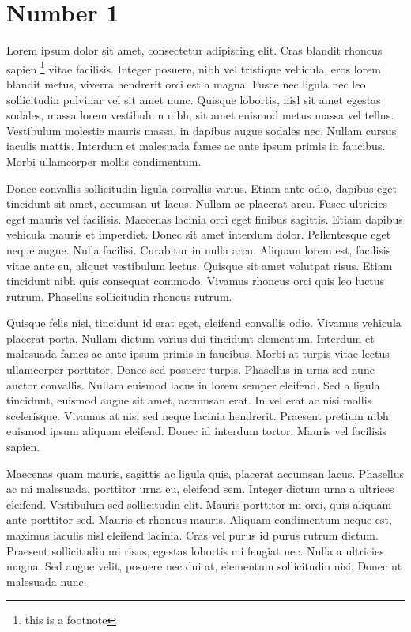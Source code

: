 \documentclass{tufte-handout}
\begin{document}
\section{Number 1}\label{number-1}

Lorem ipsum dolor sit amet, consectetur adipiscing elit. Cras blandit
rhoncus sapien \footnote{this is a footnote} vitae facilisis. Integer
posuere, nibh vel tristique vehicula, eros lorem blandit metus, viverra
hendrerit orci est a magna. Fusce nec ligula nec leo sollicitudin
pulvinar vel sit amet nunc. Quisque lobortis, nisl sit amet egestas
sodales, massa lorem vestibulum nibh, sit amet euismod metus massa vel
tellus. Vestibulum molestie mauris massa, in dapibus augue sodales nec.
Nullam cursus iaculis mattis. Interdum et malesuada fames ac ante ipsum
primis in faucibus. Morbi ullamcorper mollis condimentum.

Donec convallis sollicitudin ligula convallis varius. Etiam ante odio,
dapibus eget tincidunt sit amet, accumsan ut lacus. Nullam ac placerat
arcu. Fusce ultricies eget mauris vel facilisis. Maecenas lacinia orci
eget finibus sagittis. Etiam dapibus \autocite{Lande1979} vehicula
mauris et imperdiet. Donec sit amet interdum dolor. Pellentesque eget
neque augue. Nulla facilisi. Curabitur in nulla arcu. Aliquam lorem est,
facilisis vitae ante eu, aliquet vestibulum lectus. Quisque sit amet
volutpat risus. Etiam tincidunt nibh quis consequat commodo. Vivamus
rhoncus orci quis leo luctus rutrum. Phasellus sollicitudin rhoncus
rutrum.

Quisque felis nisi, tincidunt id erat eget, eleifend convallis odio.
Vivamus vehicula placerat porta. Nullam dictum varius dui tincidunt
elementum. Interdum et malesuada fames ac ante ipsum primis in faucibus.
Morbi at turpis vitae lectus ullamcorper porttitor. Donec sed posuere
turpis. Phasellus in urna sed nunc auctor convallis. Nullam euismod
lacus in lorem semper eleifend. Sed a ligula tincidunt, euismod augue
sit amet, accumsan erat. In vel erat ac nisi mollis scelerisque. Vivamus
at nisi sed neque lacinia hendrerit. Praesent pretium nibh euismod ipsum
aliquam eleifend. Donec id interdum tortor. Mauris vel facilisis sapien.

Maecenas quam mauris, sagittis ac ligula quis, placerat accumsan lacus.
Phasellus ac mi malesuada, porttitor urna eu, eleifend sem. Integer
dictum urna a ultrices eleifend. Vestibulum sed sollicitudin elit.
Mauris porttitor mi orci, quis aliquam ante porttitor sed. Mauris et
rhoncus mauris. Aliquam condimentum neque est, maximus iaculis nisl
eleifend lacinia. Cras vel purus id purus rutrum dictum. Praesent
sollicitudin mi risus, egestas lobortis mi feugiat nec. Nulla a
ultricies magna. Sed augue velit, posuere nec dui at, elementum
sollicitudin nisi. Donec ut malesuada nunc.
\end{document}
